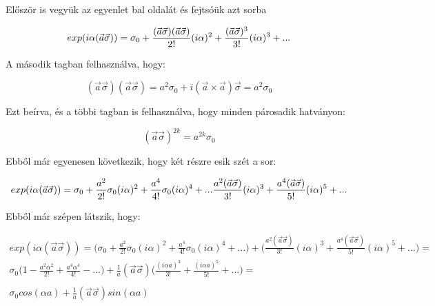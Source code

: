 \documentclass[a4paper,12pt]{article}
\begin{document}
\par Először is vegyük az egyenlet bal oldalát és fejtsóük azt sorba

\begin{equation*}
exp(i\alpha(\vec{a}\vec{\sigma})) = \sigma_0 + \frac{(\vec{a}\vec{\sigma})(\vec{a}\vec{\sigma})}{2!}(i\alpha)^{2} + \frac{(\vec{a}\vec{\sigma})^{3}}{3!}(i\alpha)^{3} + ... \\
\end{equation*}

\par A második tagban felhasználva, hogy:

\begin{equation*}
(\vec{a}\vec{\sigma})(\vec{a}\vec{\sigma}) = a^{2}\sigma_0 + i(\vec{a} \times \vec{a})\vec{\sigma} = a^{2}\sigma_0
\end{equation*}

\par Ezt beírva, és a többi tagban is felhasználva, hogy minden párosadik hatványon:

\begin{equation*}
(\vec{a}\vec{\sigma})^{2k} = a^{2k}\sigma_0
\end{equation*}

\par Ebből már egyenesen következik, hogy két részre esik szét a sor:

\begin{equation*}
exp(i\alpha(\vec{a}\vec{\sigma})) = \sigma_0 + \frac{a^{2}}{2!}\sigma_0 (i\alpha)^{2} + \frac{a^{4}}{4!}\sigma_0 (i\alpha)^{4} + ... \\
\frac{a^{2}(\vec{a}\vec{\sigma})}{3!}(i\alpha)^{3} + \frac{a^{4}(\vec{a}\vec{\sigma})}{5!}(i\alpha)^{5} + ...
\end{equation*}

\par Ebből már szépen látszik, hogy:

\begin{equation*}
\begin{gathered}
exp(i\alpha(\vec{a}\vec{\sigma})) = \Big( \sigma_0 + \frac{a^{2}}{2!}\sigma_0 (i\alpha)^{2} + \frac{a^{4}}{4!}\sigma_0 (i\alpha)^{4} + ... \Big) + \Big( 
\frac{a^{2}(\vec{a}\vec{\sigma})}{3!}(i\alpha)^{3} + \frac{a^{4}(\vec{a}\vec{\sigma})}{5!}(i\alpha)^{5} + ... \Big)= \\
\sigma_0 \Big(1 - \frac{a^{2}\alpha^{2}}{2!} + \frac{a^{4}\alpha^{4}}{4!} - ...\Big) + \frac{1}{a}(\vec{a}\vec{\sigma}) \Big(\frac{(i\alpha a)^{3}}{3!} + \frac{(i\alpha a)^{5}}{5!} + ...\Big) = \\ \\
\sigma_0 cos(\alpha a) + \frac{1}{a}(\vec{a}\vec{\sigma}) sin(\alpha a)
\end{gathered}
\end{equation*}
\end{document}
